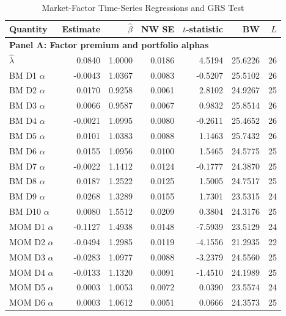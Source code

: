 \begin{table}[H]
  \centering
  \caption{Market-Factor Time-Series Regressions and GRS Test}
  \label{tab:4d-regressions}
  \begin{minipage}{0.99\textwidth}
    \centering
    \scriptsize
    \begin{tabular*}{\linewidth}{@{\extracolsep{\fill}}lrrrrrr@{}}
      \toprule
      Quantity & Estimate & $\hat{\beta}$ & NW SE & $t$-statistic & BW & $L$ \\
      \midrule
      \multicolumn{7}{l}{\textbf{Panel A: Factor premium and portfolio alphas}} \\
      $\hat{\lambda}$ & 0.0840 & 1.0000 & 0.0186 & 4.5194 & 25.6226 & 26 \\
      BM D1 $\alpha$ & -0.0043 & 1.0367 & 0.0083 & -0.5207 & 25.5102 & 26 \\
      BM D2 $\alpha$ & 0.0170 & 0.9258 & 0.0061 & 2.8102 & 24.9267 & 25 \\
      BM D3 $\alpha$ & 0.0066 & 0.9587 & 0.0067 & 0.9832 & 25.8514 & 26 \\
      BM D4 $\alpha$ & -0.0021 & 1.0995 & 0.0080 & -0.2611 & 25.4652 & 26 \\
      BM D5 $\alpha$ & 0.0101 & 1.0383 & 0.0088 & 1.1463 & 25.7432 & 26 \\
      BM D6 $\alpha$ & 0.0155 & 1.0956 & 0.0100 & 1.5465 & 24.5775 & 25 \\
      BM D7 $\alpha$ & -0.0022 & 1.1412 & 0.0124 & -0.1777 & 24.3870 & 25 \\
      BM D8 $\alpha$ & 0.0187 & 1.2522 & 0.0125 & 1.5005 & 24.7517 & 25 \\
      BM D9 $\alpha$ & 0.0268 & 1.3289 & 0.0155 & 1.7301 & 23.5315 & 24 \\
      BM D10 $\alpha$ & 0.0080 & 1.5512 & 0.0209 & 0.3804 & 24.3176 & 25 \\
      MOM D1 $\alpha$ & -0.1127 & 1.4938 & 0.0148 & -7.5939 & 23.5129 & 24 \\
      MOM D2 $\alpha$ & -0.0494 & 1.2985 & 0.0119 & -4.1556 & 21.2935 & 22 \\
      MOM D3 $\alpha$ & -0.0283 & 1.0977 & 0.0088 & -3.2379 & 24.5560 & 25 \\
      MOM D4 $\alpha$ & -0.0133 & 1.1320 & 0.0091 & -1.4510 & 24.1989 & 25 \\
      MOM D5 $\alpha$ & 0.0003 & 1.0053 & 0.0072 & 0.0390 & 23.5574 & 24 \\
      MOM D6 $\alpha$ & 0.0003 & 1.0612 & 0.0051 & 0.0666 & 24.3573 & 25 \\

\end{tabular*}
\end{minipage}
\end{table}
